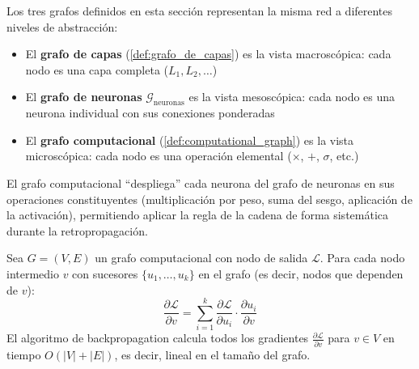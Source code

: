 Los tres grafos definidos en esta sección representan la misma red a diferentes niveles de abstracción:
\begin{itemize}
	\item El \textbf{grafo de capas} (\autoref{def:grafo_de_capas}) es la vista macroscópica: cada nodo es una capa completa ($L_1, L_2, \ldots$)
	\item El \textbf{grafo de neuronas} $\mathcal{G}_{\text{neuronas}}$ es la vista mesoscópica: cada nodo es una neurona individual con sus conexiones ponderadas
	\item El \textbf{grafo computacional} (\autoref{def:computational_graph}) es la vista microscópica: cada nodo es una operación elemental ($\times$, $+$, $\sigma$, etc.)
\end{itemize}
El grafo computacional ``despliega'' cada neurona del grafo de neuronas en sus operaciones constituyentes (multiplicación por peso, suma del sesgo, aplicación de la activación), permitiendo aplicar la regla de la cadena de forma sistemática durante la retropropagación.

\begin{theorem}\label{thm:backprop}
	Sea \(G = (V, E)\) un grafo computacional con nodo de salida \(\mathcal{L}\). Para cada nodo intermedio \(v\) con sucesores \(\{u_1, \ldots, u_k\}\) en el grafo (es decir, nodos que dependen de \(v\)):
	\[
		\frac{\partial \mathcal{L}}{\partial v} = \sum_{i=1}^{k} \frac{\partial \mathcal{L}}{\partial u_i} \cdot \frac{\partial u_i}{\partial v}
	\]
	El algoritmo de backpropagation calcula todos los gradientes \(\frac{\partial \mathcal{L}}{\partial v}\) para \(v \in V\) en tiempo \(O(|V| + |E|)\), es decir, lineal en el tamaño del grafo.
\end{theorem}

